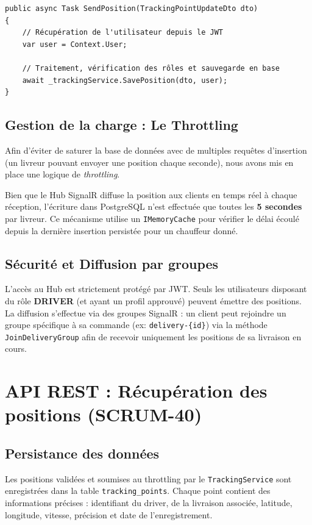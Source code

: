 \documentclass[11pt,a4paper]{report}
\begin{document}
\begin{codebox}
\begin{lstlisting}[style=javastyle]
public async Task SendPosition(TrackingPointUpdateDto dto)
{
    // Récupération de l'utilisateur depuis le JWT
    var user = Context.User;
    
    // Traitement, vérification des rôles et sauvegarde en base
    await _trackingService.SavePosition(dto, user);
}
\end{lstlisting}
\end{codebox}

\section{Gestion de la charge : Le Throttling}
Afin d'éviter de saturer la base de données avec de multiples requêtes d'insertion (un livreur pouvant envoyer une position chaque seconde), nous avons mis en place une logique de \textit{throttling}.

\begin{analysisbox}
Bien que le Hub SignalR diffuse la position aux clients en temps réel à chaque réception, l'écriture dans PostgreSQL n'est effectuée que toutes les \textbf{5 secondes} par livreur.
Ce mécanisme utilise un \texttt{IMemoryCache} pour vérifier le délai écoulé depuis la dernière insertion persistée pour un chauffeur donné. 
\end{analysisbox}

\section{Sécurité et Diffusion par groupes}
L'accès au Hub est strictement protégé par JWT. Seuls les utilisateurs disposant du rôle \textbf{DRIVER} (et ayant un profil approuvé) peuvent émettre des positions. 
La diffusion s'effectue via des groupes SignalR : un client peut rejoindre un groupe spécifique à sa commande (ex: \texttt{delivery-\{id\}}) via la méthode \texttt{JoinDeliveryGroup} afin de recevoir uniquement les positions de sa livraison en cours.

\chapter{API REST : Récupération des positions (SCRUM-40)}
\section{Persistance des données}
Les positions validées et soumises au throttling par le \texttt{TrackingService} sont enregistrées dans la table \texttt{tracking\_points}. Chaque point contient des informations précises : identifiant du driver, de la livraison associée, latitude, longitude, vitesse, précision et date de l'enregistrement.
\end{document}
